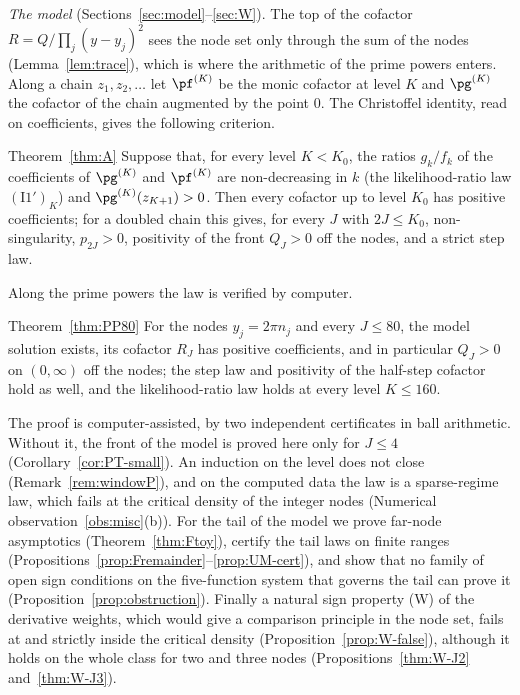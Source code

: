 \emph{The model} (Sections~\ref{sec:model}--\ref{sec:W}). The top of the cofactor $R=Q/\prod_j(y-y_j)^2$ sees the node set only
through the sum of the nodes (Lemma~\ref{lem:trace}), which is where the arithmetic of the prime powers enters. Along a
chain $z_1,z_2,\ldots$ let $\pf^{(K)}$ be the monic cofactor at level $K$ and $\pg^{(K)}$ the cofactor of the chain
augmented by the point $0$. The Christoffel identity, read on coefficients, gives the following criterion.

\begin{restate}{Theorem~\ref{thm:A}}
Suppose that, for every level $K<K_0$, the ratios $g_k/f_k$ of the coefficients of $\pg^{(K)}$ and $\pf^{(K)}$ are
non-decreasing in $k$ \textup{(}the likelihood-ratio law $(\mathrm{I1}')_K$\textup{)} and $\pg^{(K)}(z_{K+1})>0$. Then every
cofactor up to level $K_0$ has positive coefficients; for a doubled chain this gives, for every $J$ with $2J\le K_0$,
non-singularity, $p_{2J}>0$, positivity of the front $Q_J>0$ off the nodes, and a strict step law.
\end{restate}

Along the prime powers the law is verified by computer.

\begin{restate}{Theorem~\ref{thm:PP80}}
For the nodes $y_j=2\pi n_j$ and every $J\le80$, the model solution exists, its cofactor $R_J$ has positive
coefficients, and in particular $Q_J>0$ on $(0,\infty)$ off the nodes; the step law and positivity of the half-step
cofactor hold as well, and the likelihood-ratio law holds at every level $K\le160$.
\end{restate}

The proof is computer-assisted, by two independent certificates in ball arithmetic. Without it, the front of the model is
proved here only for $J\le4$ (Corollary~\ref{cor:PT-small}). An induction on the level does not close
(Remark~\ref{rem:windowP}), and on the computed data the law is a sparse-regime law, which fails at the critical density of
the integer nodes (Numerical observation~\ref{obs:misc}(b)). For the tail of the model we prove far-node asymptotics
(Theorem~\ref{thm:Ftoy}), certify the tail laws on finite ranges (Propositions~\ref{prop:Fremainder}--\ref{prop:UM-cert}), and
show that no family of open sign conditions on the five-function system that governs the tail can prove it
(Proposition~\ref{prop:obstruction}). Finally a natural sign property (W) of the derivative weights, which would give a
comparison principle in the node set, fails at and strictly inside the critical density
(Proposition~\ref{prop:W-false}), although it holds on the whole class for two and three nodes
(Propositions~\ref{thm:W-J2} and~\ref{thm:W-J3}).

